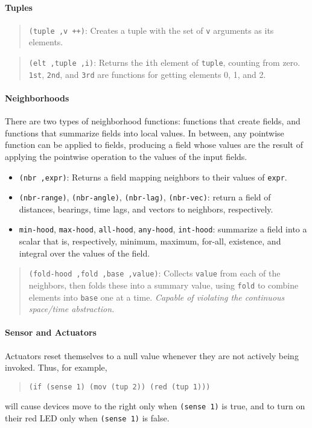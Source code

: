 \documentclass{article}
\newcommand\violation{{\em Capable of violating the continuous
    space/time abstraction.}}
\newcommand\code[1]{\begin{quote}\var{#1}\end{quote}}
\newcommand\function[2]
{\begin{quote}{\tt #1}: #2 \end{quote}}
\newcommand\var[1]{{\tt #1}}
\begin{document}
\paragraph{Tuples}

\function{(tuple ,v ++)}{Creates a tuple with the set of
  \var{v} arguments as its elements.}

\function{(elt ,tuple ,i)}{Returns the \var{i}th element of
  \var{tuple}, counting from zero.  \var{1st}, \var{2nd}, and
  \var{3rd} are functions for getting elements 0, 1, and 2.}

\paragraph{Neighborhoods}

There are two types of neighborhood functions: functions that create
fields, and functions that summarize fields into local values.  In
between, any pointwise function can be applied to fields, producing a
field whose values are the result of applying the pointwise operation
to the values of the input fields.

\begin{itemize}
\item \var{(nbr ,expr)}: Returns a field mapping neighbors to their
  values of \var{expr}.
\item \var{(nbr-range)}, \var{(nbr-angle)}, \var{(nbr-lag)}, \var{(nbr-vec)}:
  return a field of distances, bearings, time lags, and vectors to
  neighbors, respectively.
\item \var{min-hood}, \var{max-hood}, \var{all-hood}, \var{any-hood},
  \var{int-hood}: summarize a field into a scalar that is,
  respectively, minimum, maximum, for-all, existence, and integral
  over the values of the field.
\end{itemize}

\function{(fold-hood ,fold ,base ,value)}{Collects \var{value} from
  each of the neighbors, then folds these into a summary value, using
  \var{fold} to combine elements into \var{base} one at a
  time. \violation{}}

\paragraph{Sensor and Actuators}

Actuators reset themselves to a null value whenever they are not
actively being invoked.  Thus, for example, 
\code{(if (sense 1) (mov (tup 2)) (red (tup 1)))} 
will cause devices move to the right only when \var{(sense 1)} is
true, and to turn on their red LED only when \var{(sense 1)} is false.
\end{document}
